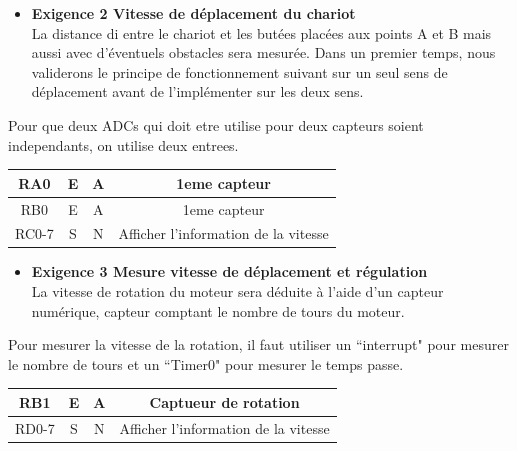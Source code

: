 \documentclass{article}
\begin{document}
\begin{itemize}	
	\item \textbf{Exigence 2 Vitesse de déplacement du chariot}\\
La distance di entre le chariot et les butées placées aux points A et B mais aussi avec d’éventuels obstacles sera mesurée. Dans un premier temps, nous validerons le principe de fonctionnement suivant sur un seul sens de déplacement avant de l’implémenter sur les deux sens. 
\end{itemize}
Pour que deux ADCs qui doit etre utilise pour deux capteurs soient independants, on utilise deux entrees.


\begin{table}[htbp]
\centering
\begin{tabular}[h]{|c|c|c|c|}
	\hline
	RA0&E&A&1eme capteur\\
	\hline
	RB0&E&A&1eme capteur\\
	\hline
	RC0-7&S&N&Afficher l'information de la vitesse\\
	\hline
\end{tabular}
\end{table}


\begin{itemize}	
	\item \textbf{Exigence 3 Mesure vitesse de déplacement et régulation}\\
	La vitesse de rotation du moteur sera déduite à l’aide d’un capteur numérique, capteur comptant le nombre de tours du moteur.
\end{itemize}
Pour mesurer la vitesse de la rotation, il faut utiliser un ``interrupt" pour mesurer le nombre de tours et un ``Timer0" pour mesurer le temps passe.
\begin{table}[htbp]
	\centering
\begin{tabular}[h]{|c|c|c|c|}
	\hline
	RB1&E&A&Captueur de rotation\\
	\hline
	RD0-7&S&N&Afficher l'information de la vitesse\\
    \hline
\end{tabular}
\end{table}
\end{document}
